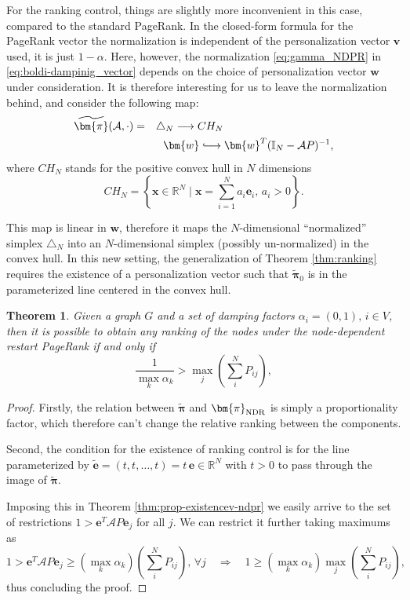\documentclass[sn-mathphys-ay]{sn-jnl}%
\newcommand{\R}{\mathbb{R}}
\newcommand{\I}{\mathbb{I}}
\newcommand{\bx}{\mathbf{x}}
\newcommand{\bv}{\bm{v}}
\newcommand{\bw}{\bm{w}}
\newcommand{\be}{\mathbf{e}}
\newcommand{\cA}{\mathcal{A}}
\def\nn{\nonumber}
\theoremstyle{thmstyleone}%
\newtheorem{theorem}{Theorem}%
\theoremstyle{thmstyletwo}%
\theoremstyle{thmstylethree}%
\begin{document}
For the ranking control, things are slightly more inconvenient in this case, compared to the standard PageRank. In the closed-form formula for the PageRank vector the normalization is independent of the personalization vector $\bv$ used, it is just $1-\alpha$. Here, however, the normalization \eqref{eq:gamma_NDPR} in \eqref{eq:boldi-dampinig_vector} depends on the choice of personalization vector $\bw$ under consideration. It is therefore interesting for us to leave the normalization behind, and consider the following map:
\begin{align}
	\widetilde{\bm{\pi}}(\cA,\cdot) =&\quad \triangle_N \longrightarrow CH_N \nn \\
	&\quad\,\,\,\, \bw \lhook\joinrel\longrightarrow \bw^T(\I_N -\cA P)^{-1},
\end{align}
where $CH_N$ stands for the positive convex hull in $N$ dimensions 
\begin{equation}
	CH_N = \left\{\bx\in \mathbb{R}^N \;\bigg|\; \bx = \sum_{i=1}^N{a_i \be_i}, \, a_i>0  \right\}.
\end{equation}

This map is linear in $\bw$, therefore it maps the $N$-dimensional ``normalized'' simplex $\triangle_N$ into an $N$-dimensional simplex (possibly un-normalized) in the convex hull. In this new setting, the generalization of Theorem \ref{thm:ranking} requires the existence of a personalization vector such that $\widetilde{\bm{\pi}}_0$ is in the parameterized line centered in the convex hull.

\begin{theorem}
	Given a graph $G$ and a set of damping factors $\alpha_i=(0,1),\, i\in V$, then it is possible to obtain any ranking of the nodes under the node-dependent restart PageRank if and only if
	\begin{equation}
		\frac{1}{\max_k \alpha_k} >  \max_j \left(\sum_i^N P_{ij} \right),
	\end{equation}
\end{theorem}

\begin{proof}
	Firstly, the relation between $\widetilde{\bm{\pi}}$ and $\bm{\pi}_{\rm NDR}$ is simply a proportionality factor, which therefore can't change the relative ranking between the components. 
	
	Second, the condition for the existence of ranking control is for the line parameterized by $\tilde{\be}=(t,t,\dots,t)=t\, \be \in\R^N$ with $t>0$ to pass through the image of $\widetilde{\bm{\pi}}$. 
	
	Imposing this in Theorem \ref{thm:prop-existencev-ndpr} we easily arrive to the set of restrictions $1 > \be^T \cA P \be_j$ for all $j$. We can restrict it further taking maximums as 
	\begin{equation}
		1 > \be^T \cA P \be_j \geq (\max_k \alpha_k)  \left(\sum_i^N P_{ij}\right), \,\forall j\quad \Rightarrow\quad  1 \geq (\max_k \alpha_k)  \max_j\left(\sum_i^N P_{ij}\right),
	\end{equation}
	thus concluding the proof.
\end{proof}
\end{document}
